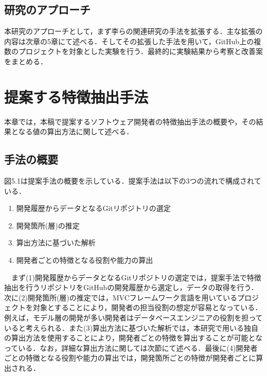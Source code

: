 \documentclass{funthesis}
\begin{document}
\section{研究のアプローチ}
本研究のアプローチとして，まず李ら\cite{risyo}の関連研究の手法を拡張する．主な拡張の内容は次章の5章にて述べる．そしてその拡張した手法を用いて，GitHub上の複数のプロジェクトを対象とした実験を行う．最終的に実験結果から考察と改善案をまとめる．

\chapter{提案する特徴抽出手法}

本章では，本稿で提案するソフトウェア開発者の特徴抽出手法の概要や，その結果となる値の算出方法に関して述べる．
\section{手法の概要}
図5.1は提案手法の概要を示している．提案手法は以下の3つの流れで構成されている．

\begin{enumerate}
\renewcommand{\labelenumi}{(\arabic{enumi})}
 \item 開発履歴からデータとなるGitリポジトリの選定
 \item 開発箇所(層)の推定
 \item 算出方法に基づいた解析
 \item 開発者ごとの特徴となる役割や能力の算出
\end{enumerate}
　まず(1)開発履歴からデータとなるGitリポジトリの選定では，提案手法で特徴抽出を行うリポジトリをGitHubの開発履歴から選定し，データの取得を行う．次に(2)開発箇所(層)の推定では，MVCフレームワーク言語を用いているプロジェクトを対象とすることにより，開発者の担当役割の想定が容易となっている．例えば，モデル層の開発が多い開発者はデータベースエンジニアの役割を担っていると考えられる．また(3)算出方法に基づいた解析では，本研究で用いる独自の算出方法を使用することにより，開発者ごとの特徴を算出することが可能となっている．なお，詳細な算出方法に関しては次節にて述べる．最後に(4)開発者ごとの特徴となる役割や能力の算出では，開発箇所ごとの特徴が開発者ごとに算出される．
\end{document}

